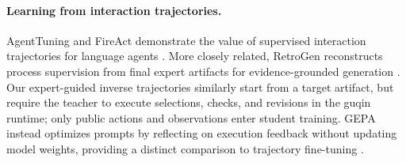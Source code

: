 \paragraph{Learning from interaction trajectories.}
AgentTuning and FireAct demonstrate the value of supervised interaction trajectories for language agents \cite{zeng2024agenttuning,chen2023fireact}. More closely related, RetroGen reconstructs process supervision from final expert artifacts for evidence-grounded generation \cite{huang2026retrogen}. Our expert-guided inverse trajectories similarly start from a target artifact, but require the teacher to execute selections, checks, and revisions in the guqin runtime; only public actions and observations enter student training. GEPA instead optimizes prompts by reflecting on execution feedback without updating model weights, providing a distinct comparison to trajectory fine-tuning \cite{agrawal2026gepa}.
